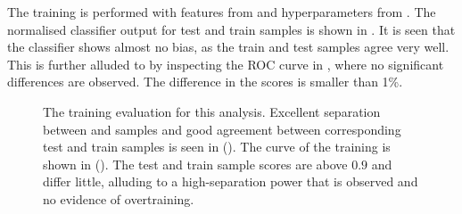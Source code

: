The training is performed with features from  and hyperparameters from .
The normalised classifier output for test and train samples is shown in .
It is seen that the classifier shows almost no bias, as the train and test samples agree very well.
This is further alluded to by inspecting the ROC curve in , where no significant differences are observed.
The difference in the \AUC scores is smaller than 1\%.
\begin{figure}[hbtp!]
    \centering
    \caption{\label{fig:training_evaluation} The training evaluation for this analysis.
    Excellent separation between \mbox{\epem\ra\qqbar} and \mbox{\BtoXsgamma} samples and good agreement between corresponding test and train samples is seen in ().
    The \ROC curve of the training is shown in ().
    The test and train sample \AUC scores are above $0.9$ and differ little, alluding to a high-separation power that is observed and no evidence of overtraining.
    }
\end{figure}

